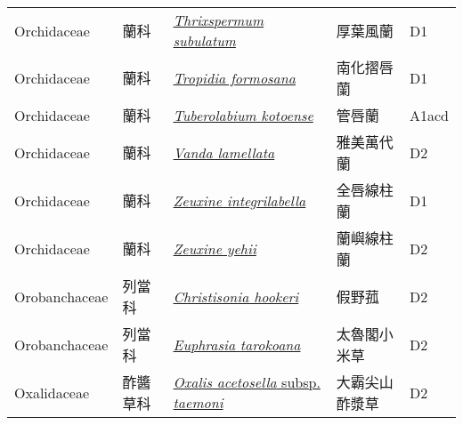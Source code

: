{\begin{longtable}{L{2.5cm}L{2cm}L{5cm}L{2.5cm}L{3cm}}
    Orchidaceae & 蘭科 & \href{http://www.theplantlist.org/tpl1.1/search?q=Thrixspermum+subulatum}{\textit{Thrixspermum subulatum} } & 厚葉風蘭 & D1    \\
    Orchidaceae & 蘭科 & \href{http://www.theplantlist.org/tpl1.1/search?q=Tropidia+formosana}{\textit{Tropidia formosana} } & 南化摺唇蘭 & D1    \\
    Orchidaceae & 蘭科 & \href{http://www.theplantlist.org/tpl1.1/search?q=Tuberolabium+kotoense}{\textit{Tuberolabium kotoense} } & 管唇蘭 & A1acd    \\
    Orchidaceae & 蘭科 & \href{http://www.theplantlist.org/tpl1.1/search?q=Vanda+lamellata}{\textit{Vanda lamellata} } & 雅美萬代蘭 & D2    \\
    Orchidaceae & 蘭科 & \href{http://www.theplantlist.org/tpl1.1/search?q=Zeuxine+integrilabella}{\textit{Zeuxine integrilabella} } & 全唇線柱蘭 & D1    \\
    Orchidaceae & 蘭科 & \href{http://www.theplantlist.org/tpl1.1/search?q=Zeuxine+yehii}{\textit{Zeuxine yehii} } & 蘭嶼線柱蘭 & D2    \\
    Orobanchaceae & 列當科 & \href{http://www.theplantlist.org/tpl1.1/search?q=Christisonia+hookeri}{\textit{Christisonia hookeri} } & 假野菰 & D2    \\
    Orobanchaceae & 列當科 & \href{http://www.theplantlist.org/tpl1.1/search?q=Euphrasia+tarokoana}{\textit{Euphrasia tarokoana} } & 太魯閣小米草 & D2    \\
    Oxalidaceae & 酢醬草科 & \href{http://www.theplantlist.org/tpl1.1/search?q=Oxalis+acetosella+subsp.+taemoni}{\textit{Oxalis acetosella} subsp. \textit{taemoni} } & 大霸尖山酢漿草 & D2    \\

\end{longtable}}
